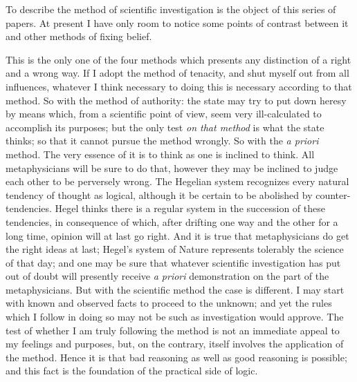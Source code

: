 \documentclass[]{article}
\begin{document}
To describe the method of scientific investigation is the object of this series of papers. At present I have only room to notice some points of contrast between it and other methods of fixing belief.

This is the only one of the four methods which presents any distinction of a right and a wrong way. If I adopt the method of tenacity, and shut myself out from all influences, whatever I think necessary to doing this is necessary according to that method. So with the method of authority: the state may try to put down heresy by means which, from a scientific point of view, seem very ill-calculated to accomplish its purposes; but the only test \emph{on that method} is what the state thinks; so that it cannot pursue the method wrongly. So with the \emph{a priori} method. The very essence of it is to think as one is inclined to think. All metaphysicians will be sure to do that, however they may be inclined to judge each other to be perversely wrong. The Hegelian system recognizes every natural tendency of thought as logical, although it be certain to be abolished by counter-tendencies. Hegel thinks there is a regular system in the succession of these tendencies, in consequence of which, after drifting one way and the other for a long time, opinion will at last go right. And it is true that metaphysicians do get the right ideas at last; Hegel's system of Nature represents tolerably the science of that day; and one may be sure that whatever scientific investigation has put out of doubt will presently receive \emph{a priori} demonstration on the part of the metaphysicians. But with the scientific method the case is different. I may start with known and observed facts to proceed to the unknown; and yet the rules which I follow in doing so may not be such as investigation would approve. The test of whether I am truly following the method is not an immediate appeal to my feelings and purposes, but, on the contrary, itself involves the application of the method. Hence it is that bad reasoning as well as good reasoning is possible; and this fact is the foundation of the practical side of logic.
\end{document}
